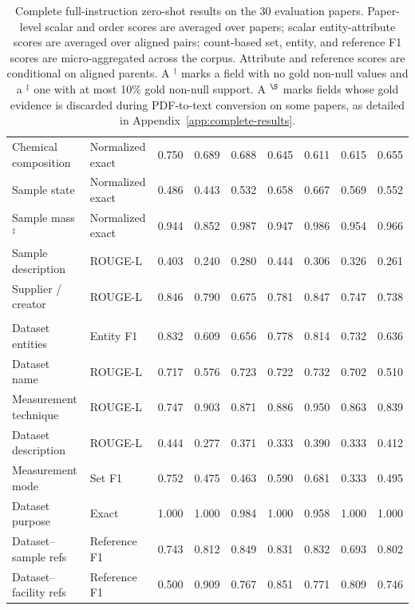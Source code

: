 \begin{table}[t]
\begin{tabular}{@{}p{}p{}rrrrrrr@{}}
    Chemical composition & Normalized exact & 0.750 & 0.689 & 0.688 & 0.645 & 0.611 & 0.615 & 0.655 \\
    Sample state & Normalized exact & 0.486 & 0.443 & 0.532 & 0.658 & 0.667 & 0.569 & 0.552 \\
    Sample mass$^{\ddagger}$ & Normalized exact & 0.944 & 0.852 & 0.987 & 0.947 & 0.986 & 0.954 & 0.966 \\
    Sample description & ROUGE-L & 0.403 & 0.240 & 0.280 & 0.444 & 0.306 & 0.326 & 0.261 \\
    Supplier / creator & ROUGE-L & 0.846 & 0.790 & 0.675 & 0.781 & 0.847 & 0.747 & 0.738 \\
    \addlinespace
    \midrule
    \multicolumn{9}{@{}l}{\textit{Datasets}} \\
    Dataset entities & Entity F1 & 0.832 & 0.609 & 0.656 & 0.778 & 0.814 & 0.732 & 0.636 \\
    Dataset name & ROUGE-L & 0.717 & 0.576 & 0.723 & 0.722 & 0.732 & 0.702 & 0.510 \\
    Measurement technique & ROUGE-L & 0.747 & 0.903 & 0.871 & 0.886 & 0.950 & 0.863 & 0.839 \\
    Dataset description & ROUGE-L & 0.444 & 0.277 & 0.371 & 0.333 & 0.390 & 0.333 & 0.412 \\
    Measurement mode & Set F1 & 0.752 & 0.475 & 0.463 & 0.590 & 0.681 & 0.333 & 0.495 \\
    Dataset purpose & Exact & 1.000 & 1.000 & 0.984 & 1.000 & 0.958 & 1.000 & 1.000 \\
    Dataset--sample refs & Reference F1 & 0.743 & 0.812 & 0.849 & 0.831 & 0.832 & 0.693 & 0.802 \\
    Dataset--facility refs & Reference F1 & 0.500 & 0.909 & 0.767 & 0.851 & 0.771 & 0.809 & 0.746 \\
    \bottomrule
  \end{tabular}
  \caption{Complete full-instruction zero-shot results on the 30 evaluation
  papers. Paper-level scalar and order scores are averaged
  over papers; scalar entity-attribute scores are averaged over aligned
  pairs; count-based set, entity, and reference F1 scores are
  micro-aggregated across the corpus. Attribute and reference scores are
  conditional
  on aligned parents. A $^{\dagger}$ marks a field
  with no gold non-null values and a $^{\ddagger}$ one with at most
  10\% gold non-null support. A $^{\S}$ marks fields whose gold evidence is
  discarded during PDF-to-text conversion on some papers, as
  detailed in Appendix~\ref{app:complete-results}.}
  \label{tab:appendix-zero-shot}
\end{table}
